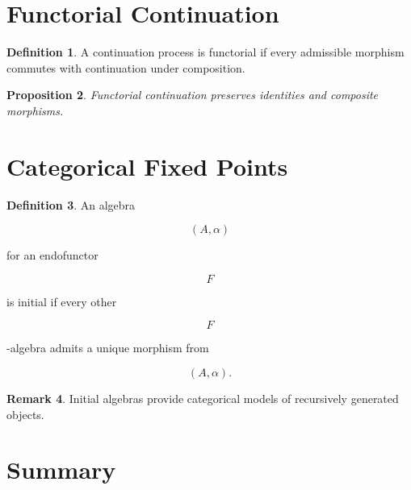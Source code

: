 \documentclass[11pt]{book}
\numberwithin{equation}{chapter}
\theoremstyle{definition}
\newtheorem{definition}{Definition}[chapter]
\newtheorem{remark}[definition]{Remark}
\theoremstyle{plain}
\newtheorem{proposition}[definition]{Proposition}
\begin{document}
\section{Functorial Continuation}

\begin{definition}

A continuation process is functorial if every admissible morphism
commutes with continuation under composition.

\end{definition}


\begin{proposition}

Functorial continuation preserves identities and composite morphisms.

\end{proposition}


\section{Categorical Fixed Points}

\begin{definition}

An algebra

\[
(A,\alpha)
\]

for an endofunctor

\[
F
\]

is initial if every other

\[
F
\]

-algebra admits a unique morphism from

\[
(A,\alpha).
\]

\end{definition}


\begin{remark}

Initial algebras provide categorical models of recursively generated
objects.

\end{remark}


\section{Summary}
\end{document}
